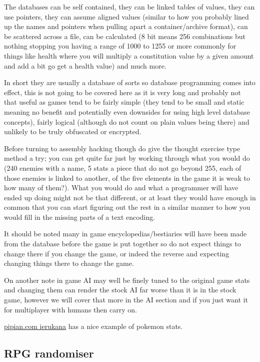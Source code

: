 \documentclass[
]{book}
\begin{document}
The databases can be self contained, they can be linked tables of values, they can use pointers, they can assume aligned values (similar to how you probably lined up the names and pointers when pulling apart a container/archive format), can be scattered across a file, can be calculated (8 bit means 256 combinations but nothing stopping you having a range of 1000 to 1255 or more commonly for things like health where you will multiply a constitution value by a given amount and add a bit go get a health value) and much more.

In short they are usually a database of sorts so database programming comes into effect, this is not going to be covered here as it is very long and probably not that useful as games tend to be fairly simple (they tend to be small and static meaning no benefit and potentially even downsides for using high level database concepts), fairly logical (although do not count on plain values being there) and unlikely to be truly obfuscated or encrypted.

Before turning to assembly hacking though do give the thought exercise type method a try; you can get quite far just by working through what you would do (240 enemies with a name, 5 stats a piece that do not go beyond 255, each of those enemies is linked to another, of the five elements in the game it is weak to how many of them?). What you would do and what a programmer will have ended up doing might not be that different, or at least they would have enough in common that you can start figuring out the rest in a similar manner to how you would fill in the missing parts of a text encoding.

It should be noted many in game encyclopedias/bestiaries will have been made from the database before the game is put together so do not expect things to change there if you change the game, or indeed the reverse and expecting changing things there to change the game.

On another note in game AI may well be finely tuned to the original game stats and changing them can render the stock AI far worse than it is in the stock game, however we will cover that more in the AI section and if you just want it for multiplayer with humans then carry on.

\href{http://www.pipian.com/ierukana/hacking/ds_evos.html}{pipian.com ierukana} has a nice example of pokemon stats.

\hypertarget{rpg-randomiser}{%
\subsection{RPG randomiser}\label{rpg-randomiser}}
\end{document}
